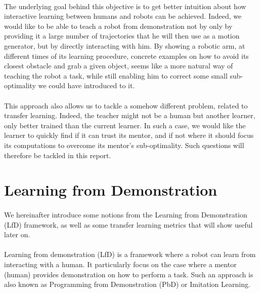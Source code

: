 \documentclass[a4paper]{report}
\begin{document}
{{			\paragraph{} The underlying goal behind this objective is to get better intuition about how interactive learning between humans and robots can be achieved. Indeed, we would like to be able to teach a robot from demonstration not by only by providing it a large number of trajectories that he will then use as a motion generator, but by directly interacting with him. By showing a robotic arm, at different times of its learning procedure, concrete examples on how to avoid its closest obstacle and grab a given object, seems like a more natural way of teaching the robot a task, while still enabling him to correct some small sub-optimality we could have introduced to it. 
			
			\paragraph{} This approach also allows us to tackle a somehow different problem, related to transfer learning. Indeed, the teacher might not be a human but another learner, only better trained than the current learner. In such a case, we would like the learner to quickly find if it can trust its mentor, and if not where it should focus its computations to overcome its mentor's sub-optimality. Such questions will therefore be tackled in this report. 
		}
		\section{Learning from Demonstration}
		{
			\paragraph{} We hereinafter introduce some notions from the Learning from Demonstration (LfD) framework, as well as some transfer learning metrics that will show useful later on. 
				\label{subsection::lfd}
				\paragraph{} Learning from demonstration (LfD) is a framework where a robot can learn from interacting with a human. It particularly focus on the case where a mentor (human) provides demonstration on how to perform a task. Such an approach is also known as Programming from Demonstration (PbD) or Imitation Learning. 
				
}}
\end{document}
